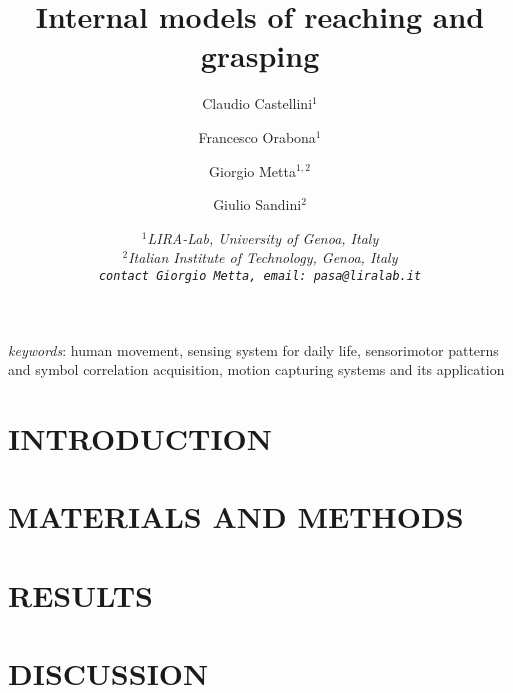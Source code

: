 \documentclass{arsubmit}
\title{Internal models of reaching and grasping}
\author{Claudio Castellini$^1$ \and Francesco Orabona$^1$ \and Giorgio Metta$^{1,2}$ \and Giulio Sandini$^2$}
\date{\small \it{
$^1$LIRA-Lab, University of Genoa, Italy\\
$^2$Italian Institute of Technology, Genoa, Italy\\
{\tt contact Giorgio Metta, email: pasa@liralab.it}
}}
\begin{document}
\maketitle

\begin{abstract}

\end{abstract}

{\it keywords}: human movement, sensing system for daily life,
sensorimotor patterns and symbol correlation acquisition, motion
capturing systems and its application

\section{INTRODUCTION}
\label{sec:introduction}


%

\section{MATERIALS AND METHODS}
\label{sec:exp_desc}


\section{RESULTS}
\label{sec:exp_res}


\section{DISCUSSION}
\label{sec:Conclusions}


{\small


}
\end{document}
